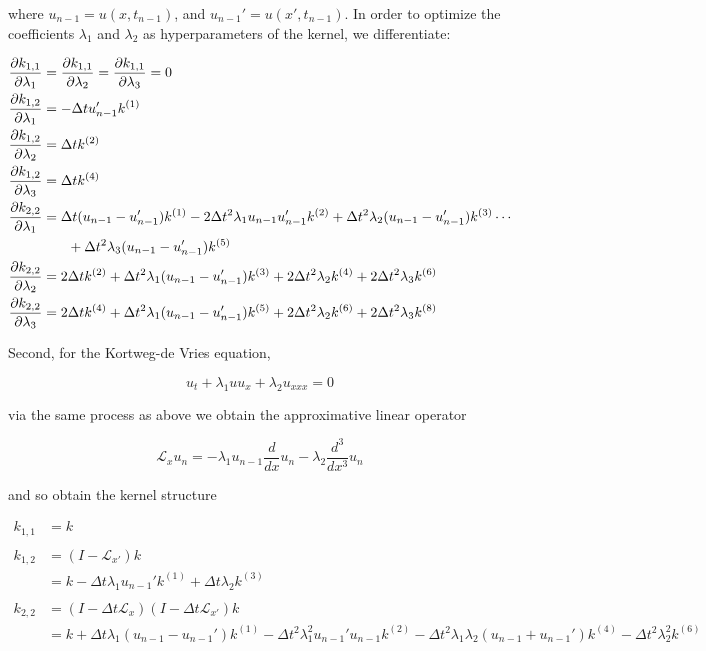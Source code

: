 \documentclass[]{article}
\begin{document}
where $u_{n-1}=u(x,t_{n-1})$, and $u_{n-1}' = u(x',t_{n-1})$. In order to optimize the coefficients $\lambda_1$ and $\lambda_2$ as hyperparameters of the kernel, we differentiate:

\begin{align*}
	\frac{\partial k_{1,1}}{\partial\lambda_1} &= \frac{\partial k_{1,1}}{\partial\lambda_2} = \frac{\partial k_{1,1}}{\partial\lambda_3} = 0\\
	\frac{\partial k_{1,2}}{\partial\lambda_1} &= -\Delta t u_{n-1}'k^{(1)}\\
	\frac{\partial k_{1,2}}{\partial\lambda_2} &= \Delta t k^{(2)}\\
	\frac{\partial k_{1,2}}{\partial\lambda_3} &= \Delta t k^{(4)}\\
	\frac{\partial k_{2,2}}{\partial\lambda_1} &= \Delta t(u_{n-1}-u_{n-1}')k^{(1)} - 2\Delta t^2\lambda_1 u_{n-1}u_{n-1}'k^{(2)} + \Delta t^2\lambda_2(u_{n-1}-u_{n-1}')k^{(3)}\cdots \\
	&\hspace{.25in}+\Delta t^2\lambda_3(u_{n-1}-u_{n-1}')k^{(5)}\\
	\frac{\partial k_{2,2}}{\partial\lambda_2} &= 2\Delta tk^{(2)} + \Delta t^2\lambda_1(u_{n-1}-u_{n-1}')k^{(3)} + 2\Delta t^2\lambda_2k^{(4)} + 2\Delta t^2\lambda_3k^{(6)}\\
	\frac{\partial k_{2,2}}{\partial \lambda_3} &= 2\Delta tk^{(4)} + \Delta t^2\lambda_1(u_{n-1}-u_{n-1}')k^{(5)} + 2\Delta t^2\lambda_2k^{(6)} + 2\Delta t^2\lambda_3k^{(8)}
\end{align*}

Second, for the Kortweg-de Vries equation, 

\[ u_t+\lambda_1uu_x+\lambda_2u_{xxx}=0  \]

via the same process as above we obtain the approximative linear operator

\[ \mathcal{L}_x u_n = -\lambda_1 u_{n-1}\frac{d}{dx}u_n-\lambda_2 \frac{d^3}{dx^3}u_n  \]

and so obtain the kernel structure

\begin{align*}
k_{1,1} &= k\\
&\\
k_{1,2} &= (I-\mathcal{L}_{x'})k\\
&= k - \Delta t\lambda_1 u_{n-1}'k^{(1)}+\Delta t\lambda_2k^{(3)}\\
&\\
k_{2,2} &= (I-\Delta t\mathcal{L}_x)(I-\Delta t\mathcal{L}_{x'})k\\
&= k + \Delta t\lambda_1(u_{n-1}-u_{n-1}')k^{(1)} - \Delta t^2\lambda_1^2u_{n-1}'u_{n-1} k^{(2)}- \Delta t^2\lambda_1\lambda_2(u_{n-1}+u_{n-1}')k^{(4)} -\Delta t^2\lambda_2^2k^{(6)}
\end{align*}
\end{document}
